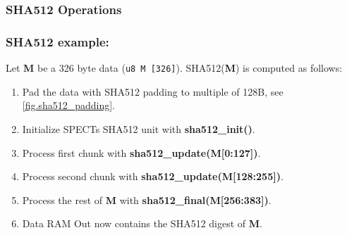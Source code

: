 \documentclass{tropic_design_spec}
\begin{document}
\subsubsection*{SHA512 Operations}




\pagebreak

\subsubsection*{SHA512 example:}

Let \textbf{M} be a 326 byte data (\texttt{u8 M [326]}). SHA512(\textbf{M}) is computed as follows:

\begin{enumerate}
    \item Pad the data with SHA512 padding to multiple of 128B, see \ref{fig.sha512_padding}.
    \item Initialize SPECTs SHA512 unit with \textbf{sha512_init()}.
    \item Process first chunk with \textbf{sha512_update(M[0:127])}.
    \item Process second chunk with \textbf{sha512_update(M[128:255])}.
    \item Process the rest of \textbf{M} with \textbf{sha512_final(M[256:383])}.
    \item Data RAM Out now contains the SHA512 digest of \textbf{M}.
\end{enumerate}
\end{document}
